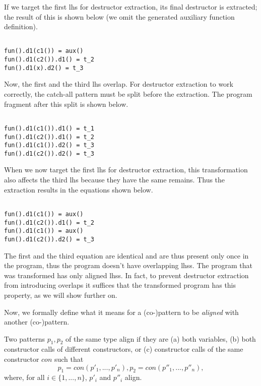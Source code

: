 If we target the first lhs for destructor extraction, its final destructor is extracted; the result of this is shown below (we omit the generated auxiliary function definition).

\begin{lstlisting}

fun().d1(c1()) = aux()
fun().d1(c2()).d1() = t_2
fun().d1(x).d2() = t_3

\end{lstlisting}

Now, the first and the third lhs overlap. For destructor extraction to work correctly, the catch-all pattern must be split before the extraction. The program fragment after this split is shown below.

\begin{lstlisting}

fun().d1(c1()).d1() = t_1
fun().d1(c2()).d1() = t_2
fun().d1(c1()).d2() = t_3
fun().d1(c2()).d2() = t_3

\end{lstlisting}

When we now target the first lhs for destructor extraction, this transformation also affects the third lhs because they have the same remains. Thus the extraction results in the equations shown below.

\begin{lstlisting}

fun().d1(c1()) = aux()
fun().d1(c2()).d1() = t_2
fun().d1(c1()) = aux()
fun().d1(c2()).d2() = t_3

\end{lstlisting}

The first and the third equation are identical and are thus present only once in the program, thus the program doesn't have overlapping lhss. The program that was transformed has only aligned lhss. In fact, to prevent destructor extraction from introducing overlaps it suffices that the transformed program has this property, as we will show further on.

Now, we formally define what it means for a (co-)pattern to be \textit{aligned} with another (co-)pattern.

\begin{definition}
Two patterns $p_1, p_2$ of the same type align if they are (a) both variables, (b) both constructor calls of different constructors, or (c) constructor calls of the same constructor $con$ such that
\[
p_1 = con(p'_1, ..., p'_n), p_2 = con(p''_1, ..., p''_n),
\]
where, for all $i \in \{1, ..., n\}$, $p'_i$ and $p''_i$ align.
\end{definition}

